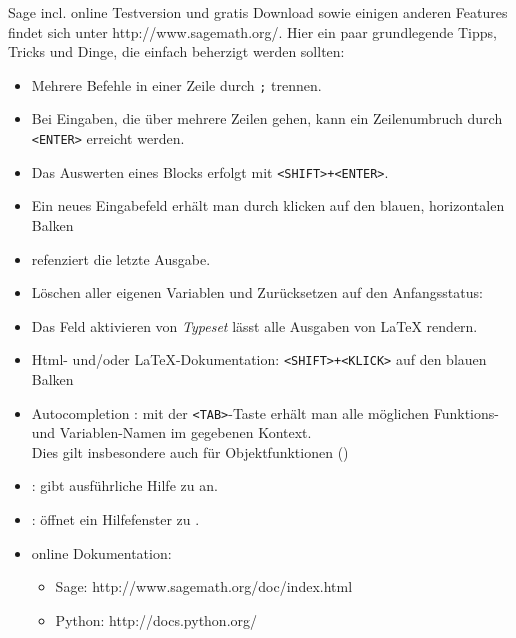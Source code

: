 \documentclass[fontsize=12pt,paper=a4,twoside,bibtotoc,idxtotoc,
liststotoc,pagesize,BCOR1.2cm,DIV15,chapterprefix,pagesize=pdftex]{scrbook}
\theoremstyle{plain}
\theoremstyle{definition}
\theoremstyle{remark}
\begin{document}
Sage incl. online Testversion und gratis Download sowie einigen anderen Features findet sich unter http://www.sagemath.org/.
Hier ein paar grundlegende Tipps, Tricks und Dinge, die einfach beherzigt werden sollten:
\begin{itemize}
 \item Mehrere Befehle in einer Zeile durch {\color{blue} \verb~;~} trennen. 
 \item Bei Eingaben, die über mehrere Zeilen gehen, kann ein
  Zeilenumbruch durch {\color{blue} \verb~<ENTER>~} erreicht werden.
 \item Das Auswerten eines Blocks erfolgt mit {\color{blue} \verb~<SHIFT>+<ENTER>~}.
 \item Ein neues Eingabefeld erhält man durch klicken auf den blauen, horizontalen Balken
 \item {\color{blue} \isage{_} } refenziert die letzte Ausgabe.
 \item Löschen aller eigenen Variablen und Zurücksetzen auf den Anfangsstatus: {\color{blue} }
 \item Das Feld aktivieren von \emph{Typeset} lässt alle Ausgaben von \LaTeX{} rendern.
 \item Html- und/oder \LaTeX-Dokumentation:{\color{blue} \verb~<SHIFT>+<KLICK>~ }auf den blauen Balken
 \item {\color{blue} Autocompletion :} mit der {\color{blue} \verb~<TAB>~}-Taste erhält man alle möglichen Funktions- und Variablen-Namen im gegebenen Kontext.\\
  Dies gilt insbesondere auch für Objektfunktionen ()
  \item{\color{blue}  :} gibt ausführliche Hilfe zu  an.
 \item {\color{blue}  :} öffnet ein Hilfefenster zu .
 \item online Dokumentation:
    \begin{itemize}
    \item Sage: http://www.sagemath.org/doc/index.html
    \item Python: http://docs.python.org/
    \end{itemize}
\end{itemize}  
\end{document}
